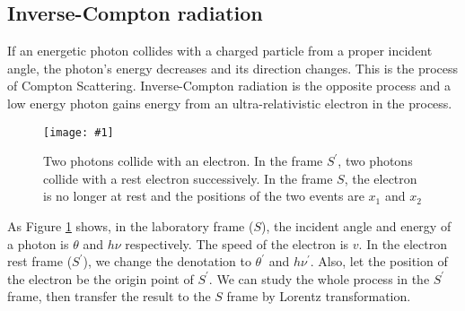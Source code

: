 \documentclass[a4paper, 12pt]{report}
\newcommand{\singleFig}[3]{
  \begin{figure}[!htp]
    \centering
    \texttt{[image: \#1]}
    \caption{#3}
    \label{fig: #1}
  \end{figure}
}
\begin{document}
    \subsection{Inverse-Compton radiation}
      If an energetic photon collides with a charged particle from a 
      proper incident angle, the photon's energy decreases and its direction changes. 
      This is the process of Compton Scattering. Inverse-Compton radiation is the 
      opposite process and a low energy photon gains energy from an ultra-relativistic 
      electron in the process. 
      
      \singleFig{inverse_compton}{0.45}{Two photons collide with an 
      electron. In the frame $S^{\prime}$, two photons collide with a rest electron 
      successively. In the frame $S$, the electron is no longer at rest and the 
      positions of the two events are $x_1$ and $x_2$}
      As Figure \ref{fig: inverse_compton} shows, in the laboratory frame ($S$), the 
      incident angle and energy of a photon is $\theta$ and $h \nu$ respectively. 
      The speed of the electron is $v$. In the electron rest frame ($S^{\prime}$), 
      we change the denotation to $\theta^{\prime}$ and $h \nu^{\prime}$. Also, let 
      the position of the electron be the origin point of $S^{\prime}$. We can study 
      the whole process in the $S^{\prime}$ frame, then transfer the result to the $S$ 
      frame by Lorentz transformation. 
\end{document}

